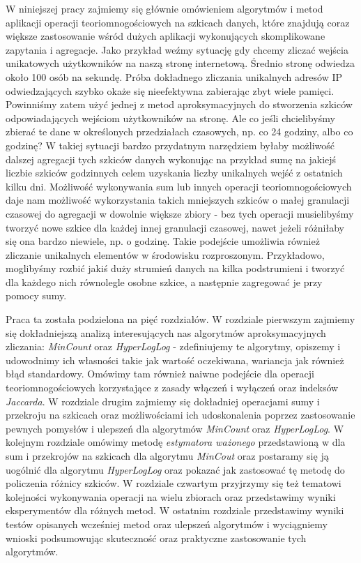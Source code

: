 W niniejszej pracy zajmiemy się głównie omówieniem algorytmów i metod aplikacji operacji teoriomnogościowych na szkicach danych, które znajdują coraz większe zastosowanie wśród dużych aplikacji wykonujących skomplikowane zapytania i agregacje. Jako przykład weźmy sytuację gdy chcemy zliczać wejścia unikatowych użytkowników na naszą stronę internetową. Średnio stronę odwiedza około 100 osób na sekundę. Próba dokładnego zliczania unikalnych adresów IP odwiedzających szybko okaże się nieefektywna zabierając zbyt wiele pamięci. Powinniśmy zatem użyć jednej z metod aproksymacyjnych do stworzenia szkiców odpowiadających wejściom użytkowników na stronę. Ale co jeśli chcielibyśmy zbierać te dane w określonych przedziałach czasowych, np. co 24 godziny, albo co godzinę? W takiej sytuacji bardzo przydatnym narzędziem byłaby możliwość dalszej agregacji tych szkiców danych wykonując na przykład sumę na jakiejś liczbie szkiców godzinnych celem uzyskania liczby unikalnych wejść z ostatnich kilku dni. Możliwość wykonywania sum lub innych operacji teoriomnogościowych daje nam możliwość wykorzystania takich mniejszych szkiców o małej granulacji czasowej do agregacji w dowolnie większe zbiory - bez tych operacji musielibyśmy tworzyć nowe szkice dla każdej innej granulacji czasowej, nawet jeżeli różniłaby się ona bardzo niewiele, np. o godzinę. Takie podejście umożliwia również zliczanie unikalnych elementów w środowisku rozproszonym. Przykładowo, moglibyśmy rozbić jakiś duży strumień danych na kilka podstrumieni i tworzyć dla każdego nich równolegle osobne szkice, a następnie zagregować je przy pomocy sumy.

Praca ta została podzielona na pięć rozdziałów. W rozdziale pierwszym zajmiemy się dokładniejszą analizą interesujących nas algorytmów aproksymacyjnych zliczania: \textit{MinCount} oraz \textit{HyperLogLog} - zdefiniujemy te algorytmy, opiszemy i udowodnimy ich własności takie jak wartość oczekiwana, wariancja jak również błąd standardowy. Omówimy tam również naiwne podejście dla operacji teoriomnogościowych korzystające z zasady włączeń i wyłączeń oraz indeksów \textit{Jaccarda}. W rozdziale drugim zajmiemy się dokładniej operacjami sumy i przekroju na szkicach oraz możliwościami ich udoskonalenia poprzez zastosowanie pewnych pomysłów i ulepszeń dla algorytmów \textit{MinCount} oraz \textit{HyperLogLog}. W kolejnym rozdziale omówimy metodę \textit{estymatora ważonego} przedstawioną w \cite{ting} dla sum i przekrojów na szkicach dla algorytmu \textit{MinCout} oraz postaramy się ją uogólnić dla algorytmu \textit{HyperLogLog} oraz pokazać jak zastosować tę metodę do policzenia różnicy szkiców. W rozdziale czwartym przyjrzymy się też tematowi kolejności wykonywania operacji na wielu zbiorach oraz przedstawimy wyniki eksperymentów dla różnych metod. W ostatnim rozdziale przedstawimy wyniki testów opisanych wcześniej metod oraz ulepszeń algorytmów i wyciągniemy wnioski podsumowując skuteczność oraz praktyczne zastosowanie tych algorytmów.